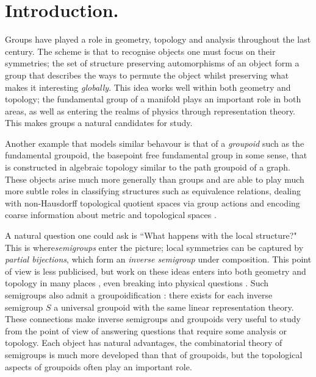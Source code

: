 \chapter{Introduction.}

Groups have played a role in geometry, topology and analysis throughout the last century. The scheme is that to recognise objects one must focus on their symmetries; the set of structure preserving automorphisms of an object form a group that describes the ways to permute the object whilst preserving what makes it interesting \textit{globally}. This idea works well within both geometry and topology; the fundamental group of a manifold plays an important role in both areas, as well as entering the realms of physics through representation theory. This makes groups a natural candidates for study.

Another example that models similar behavour is that of a \textit{groupoid} such as the fundamental groupoid, the basepoint free fundamental group in some sense, that is constructed in algebraic topology similar to the path groupoid of a graph. These objects arise much more generally than groups and are able to play much more subtle roles in classifying structures such as equivalence relations, dealing with non-Hausdorff topological quotient spaces \cite{MR1826266} via group actions and encoding coarse information about metric and topological spaces \cite{MR1905840}.

A natural question one could ask is ``What happens with the local structure?" This is where\textit{semigroups} enter the picture; local symmetries can be captured by \textit{partial bijections}, which form an \textit{inverse semigroup} under composition. This point of view is less publicised, but work on these ideas enters into both geometry and topology in many places \cite{MR0160848,MR1694900,MR1798993}, even breaking into physical questions \cite{MR1798993,MR2041539}. Such semigroups also admit a groupoidification \cite{MR1724106,MR2419901}: there exists for each inverse semigroup $S$ a universal groupoid with the same linear representation theory. These connections make inverse semigroups and groupoids very useful to study from the point of view of answering questions that require some analysis or topology. Each object has natural advantages, the combinatorial theory of semigroups is much more developed than that of groupoids, but the topological aspects of groupoids often play an important role.

